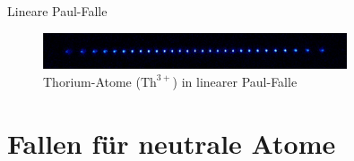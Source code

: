 \documentclass[12pt,xcolor=dvipsnames]{beamer}
\begin{document}
\begin{frame}{Lineare Paul-Falle}
	\vspace{0.2cm}
		
	\begin{figure}[h]
		\centering
		\includegraphics[width=0.8\textwidth]{./figures/29_laser_cooled_ion_chain.jpg}
		\caption{Thorium-Atome ($\mathrm{Th}^{3+}$) in linearer Paul-Falle \cite{campbell}}
	\end{figure}
	
\end{frame}

%
%

\section{Fallen für neutrale Atome}
\end{document}
